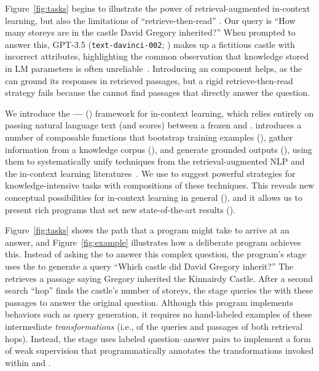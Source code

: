 Figure~\ref{fig:tasks} begins to illustrate the power of retrieval-augmented in-context learning, but also the limitations of ``retrieve-then-read'' \cite{lazaridou2022internet,izacard2022few}. Our query is ``How many storeys are in the castle David Gregory inherited?'' When prompted to answer this, GPT-3.5 (\texttt{text-davinci-002}; \citealt{ouyang2022training}) makes up a fictitious castle with incorrect attributes, highlighting the common observation that knowledge stored in LM parameters is often unreliable~\cite{shuster2021retrieval,ishii2022survey}.
Introducing an \RM{} component helps, as the \LM{} can ground its responses in retrieved passages, but a rigid retrieve-then-read strategy fails because the \RM{} cannot find passages that directly answer the question.

We introduce the \textbf{\demonstrate--\search--\predict} (\textbf{\DSP}) framework for in-context learning, which relies entirely on passing natural language text (and scores) between a frozen \RM{} and \LM{}. \DSP introduces a number of composable functions that bootstrap training examples (\demonstrate), gather information from a knowledge corpus (\search), and generate grounded outputs (\predict), using them to systematically unify techniques from the retrieval-augmented NLP and the in-context learning literatures~\citep{lee2019latent,khattab2021baleen,anantha2020open,gao2022attributed,izacard2022few,dohan2022language,zelikman2022star,zhang2022automatic}. 
We use \DSP to suggest powerful %
strategies for knowledge-intensive tasks with compositions of these techniques. This reveals new conceptual possibilities for in-context learning in general (), and it allows us to present rich programs that set new state-of-the-art results ().






Figure~\ref{fig:tasks} shows the path that a \DSP program might take to arrive at an answer, and Figure~\ref{fig:example} illustrates how a deliberate program achieves this. Instead of asking the \LM{} to answer this complex question, the program's \search stage uses the \LM{} to generate a query ``Which castle did David Gregory inherit?'' The \RM{} retrieves a passage saying Gregory inherited the Kinnairdy Castle. After a second search ``hop'' finds the castle's number of storeys, the \predict stage queries the \LM{} with these passages to answer the original question. Although this program implements behaviors such as query generation, it requires no hand-labeled examples of these intermediate \textit{transformations} (i.e., of the queries and passages of both retrieval hops). Instead, the \demonstrate stage uses labeled question--answer pairs to implement a form of weak supervision that programmatically annotates the transformations invoked within \search and \predict.



